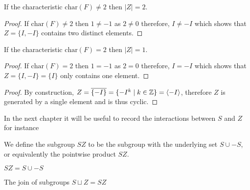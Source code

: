 \begin{lemma}
    \label{SpecialSubgroups.card_Z_eq_two_of_two_ne_zero}
    \leanok
    If the characteristic $\textrm{char}(F) \ne 2$ then $|Z| = 2$.
\end{lemma}
\begin{proof}
    If $\textrm{char}(F) \ne 2$ then $1 \ne -1$ as $2 \ne 0$ therefore, $I \ne -I$ which shows that $Z = \{I , -I\}$ contains two distinct elements.
\end{proof}

\begin{lemma}
    \label{SpecialSubgroups.card_Z_eq_one_of_two_eq_zero}
    \leanok
    If the characteristic $\textrm{char}(F) = 2$ then $|Z| = 1$. 
\end{lemma}
\begin{proof}
    If $\textrm{char}(F) = 2$ then $1 = -1$ as $2 = 0$ therefore, $I = -I$ which shows that $Z = \{I , -I\} = \{I\}$ only contains one element.
\end{proof}

\begin{lemma}[$Z$ is cyclic]
    \label{SpecialSubgroups.IsCyclic_Z}
    \leanok
\end{lemma}
\begin{proof}
    By construction, $Z = \overline{\{-I\}} = \{-I^k \; | \; k \in \mathbb{Z} \} = \langle -I \rangle$, therefore $Z$ is generated by a single element and is thus cyclic.
\end{proof}


In the next chapter it will be useful to record the interactions between $S$ and $Z$ for instance

\begin{definition}
    \label{SpecialSubgroups.SZ}
    \leanok
    We define the subgroup $SZ$ to be the subgroup with the underlying set $S \cup -S$, or equivalently the pointwise product $SZ$.
\end{definition}

\begin{remark}
\label{SpecialSubgroups.S_mul_Z_subset_SZ}
$SZ = S \cup -S$
\leanok
\end{remark}

\begin{lemma}
    \label{SpecialSubgroups.S_join_Z_eq_SZ}
    \leanok
    The join of subgroups $S \sqcup Z = SZ$
\end{lemma}

